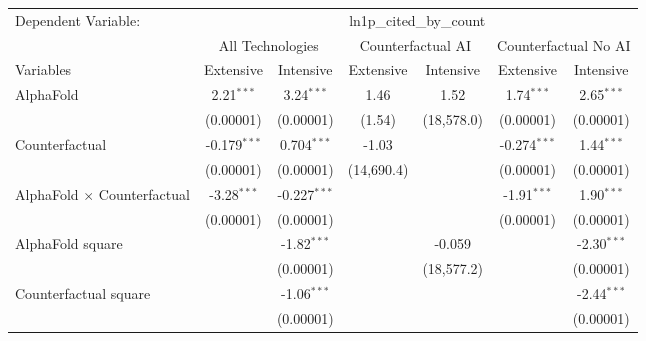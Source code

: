 \begingroup
\centering
\begin{tabular}{lcccccc}
   \tabularnewline \midrule \midrule
   Dependent Variable: & \multicolumn{6}{c}{ln1p\_cited\_by\_count}\\
 & \multicolumn{2}{c}{All Technologies} & \multicolumn{2}{c}{Counterfactual AI} & \multicolumn{2}{c}{Counterfactual No AI} \\
\cmidrule(lr){1-1}\cmidrule(lr){2-3} \cmidrule(lr){4-5} \cmidrule(lr){6-7}
Variables & \multicolumn{1}{c}{Extensive} & \multicolumn{1}{c}{Intensive} & \multicolumn{1}{c}{Extensive} & \multicolumn{1}{c}{Intensive} & \multicolumn{1}{c}{Extensive} & \multicolumn{1}{c}{Intensive} \\
\cmidrule(lr){1-1}\cmidrule(lr){2-2} \cmidrule(lr){3-3} \cmidrule(lr){4-4} \cmidrule(lr){5-5} \cmidrule(lr){6-6} \cmidrule(lr){7-7}
   AlphaFold                          & 2.21$^{***}$   & 3.24$^{***}$   & 1.46       & 1.52       & 1.74$^{***}$   & 2.65$^{***}$\\   
                                      & (0.00001)      & (0.00001)      & (1.54)     & (18,578.0) & (0.00001)      & (0.00001)\\   
   Counterfactual                     & -0.179$^{***}$ & 0.704$^{***}$  & -1.03      &            & -0.274$^{***}$ & 1.44$^{***}$\\   
                                      & (0.00001)      & (0.00001)      & (14,690.4) &            & (0.00001)      & (0.00001)\\   
   AlphaFold $\times$ Counterfactual  & -3.28$^{***}$  & -0.227$^{***}$ &            &            & -1.91$^{***}$  & 1.90$^{***}$\\   
                                      & (0.00001)      & (0.00001)      &            &            & (0.00001)      & (0.00001)\\   
   AlphaFold square                   &                & -1.82$^{***}$  &            & -0.059     &                & -2.30$^{***}$\\   
                                      &                & (0.00001)      &            & (18,577.2) &                & (0.00001)\\   
   Counterfactual square              &                & -1.06$^{***}$  &            &            &                & -2.44$^{***}$\\   
                                      &                & (0.00001)      &            &            &                & (0.00001)\\   
   \midrule

\end{tabular}
